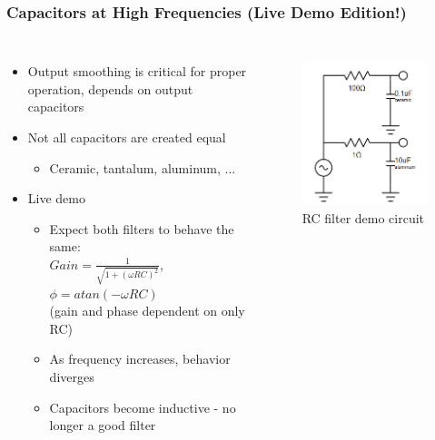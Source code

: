 \documentclass{beamer}
\begin{document}
\begin{frame}
\frametitle{Capacitors at High Frequencies {\small (Live Demo Edition!)}}
\begin{columns}[t]
\begin{itemize}
  \item Output smoothing is critical for proper operation, depends on output capacitors
  \item Not all capacitors are created equal
  \begin{itemize}
    \item Ceramic, tantalum, aluminum, ...
  \end{itemize}
  \item Live demo
  \begin{itemize}
    \item Expect both filters to behave the same: \\
    $Gain=\frac{1}{\sqrt{1+(\omega R C)^2}}$, $\phi=atan(-\omega R C)$ \\
    (gain and phase dependent on only RC) \\
    \item <2-> As frequency increases, behavior diverges
    \item <2-> Capacitors become inductive - no longer a good filter
  \end{itemize}
\end{itemize}

\begin{figure}
  \centering
  \includegraphics[scale=0.33]{images-dis4/rc-demo} \\
  RC filter demo circuit
\end{figure}
\end{columns}
\end{frame}
\end{document}
